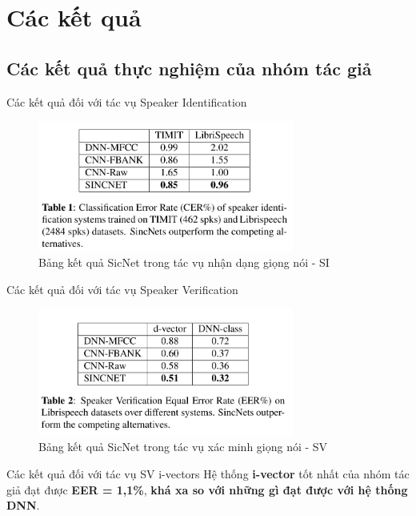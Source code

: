 \documentclass[11pt]{beamer}
\begin{document}
\section{Các kết quả}
\subsection{Các kết quả thực nghiệm của nhóm tác giả}
\begin{frame}{Các kết quả đối với tác vụ Speaker Identification}
\begin{figure}[H]
	\centering
	\includegraphics[width=0.75\textwidth]{images/performance_speaker_identification.png}
	\caption{Bảng kết quả SicNet trong tác vụ nhận dạng giọng nói - SI}
	\label{fig:writing-thesis}
\end{figure}	
\end{frame}
\begin{frame}{Các kết quả đối với tác vụ Speaker Verification}
\begin{figure}[H]
	\centering
	\includegraphics[width=0.75\textwidth]{images/performance_speaker_verification.png}
	\caption{Bảng kết quả SicNet trong tác vụ xác minh giọng nói - SV}
	\label{fig:writing-thesis}
\end{figure}	
\end{frame}
\begin{frame}{Các kết quả đối với tác vụ SV i-vectors}
	Hệ thống \textbf{i-vector} tốt nhất của nhóm tác giả đạt được \textbf{EER = 1,1\%}, \textbf{khá xa so với những gì đạt được với hệ thống DNN}.	
\end{frame}
\end{document}
